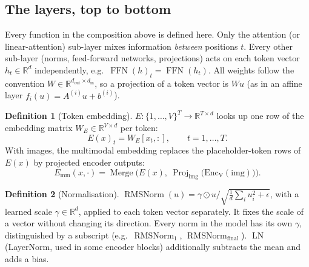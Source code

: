 \documentclass[10pt,a4paper]{article}
\newcommand{\op}[1]{\operatorname{#1}}
\theoremstyle{definition}
\newtheorem{definition}{Definition}[section]
\begin{document}
\subsection{The layers, top to bottom}\label{sec:layers}
Every function in the composition above is defined here. Only the attention (or linear-attention) sub-layer mixes information \emph{between} positions $t$. Every other sub-layer (norms, feed-forward networks, projections) acts on each token vector $h_t\in\mathbb{R}^{d}$ independently, e.g.\ $\op{FFN}(h)_t=\op{FFN}(h_t)$. All weights follow the convention $W\in\mathbb{R}^{d_{\mathrm{out}}\times d_{\mathrm{in}}}$, so a projection of a token vector is $W u$ (as in an affine layer $f_i(u)=A^{(i)}u+b^{(i)}$).
\begin{definition}[Token embedding]\label{def:embed}
$E:\{1,\dots,V\}^{T}\to\mathbb{R}^{T\times d}$ looks up one row of the embedding matrix $W_E\in\mathbb{R}^{V\times d}$ per token:
\begin{equation}
  E(x)_t = W_E[x_t,:],\qquad t=1,\dots,T.
\end{equation}
With images, the multimodal embedding replaces the placeholder-token rows of $E(x)$ by projected encoder outputs:
\begin{equation}
  E_{\mathrm{mm}}(x,\cdot) = \op{Merge}\Big(E(x),\ \op{Proj}_{\mathrm{img}}\big(\op{Enc_V}(\mathrm{img})\big)\Big).
\end{equation}
\end{definition}
\begin{definition}[Normalisation]
$\op{RMSNorm}(u)=\gamma\odot u/\sqrt{\tfrac1d\sum_i u_i^2+\epsilon}$, with a learned scale $\gamma\in\mathbb{R}^{d}$, applied to each token vector separately. It fixes the scale of a vector without changing its direction. Every norm in the model has its own $\gamma$, distinguished by a subscript (e.g.\ $\op{RMSNorm}_1$, $\op{RMSNorm}_{\mathrm{final}}$). $\op{LN}$ (LayerNorm, used in some encoder blocks) additionally subtracts the mean and adds a bias.
\end{definition}
\end{document}
